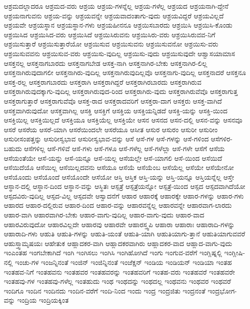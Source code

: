 {ಆಶ್ರಮದಲ್ಲಾದರೂ
ಆಶ್ರಮದ-ವರು
ಆಶ್ರಯ
ಆಶ್ರಯ-ಗಳನ್ನೆಲ್ಲ
ಆಶ್ರಯ-ಗಳೆಲ್ಲ
ಆಶ್ರಯದ
ಆಶ್ರಯನಾಗಿ-ದ್ದೇನೆ
ಆಶ್ರಯನಾಗುವನು
ಆಶ್ರಯ-ವನ್ನು
ಆಶ್ರಯವನ್ನೇ
ಆಶ್ರಯವಾದಂತಾಗು-ವುದು
ಆಶ್ರಯವಿದ್ದರೆ
ಆಶ್ರಯವಿಲ್ಲದೆ
ಆಶ್ರಯವೇ
ಆಶ್ರಯಸ್ಥಾನ
ಆಶ್ರಯಸ್ಥಾನ-ಗಳು
ಆಶ್ರಯಹೀನನೂ
ಆಶ್ರಯಿಸಬಾರದು
ಆಶ್ರಯಿಸಿ
ಆಶ್ರಯಿಸಿ-ಕೊಂಡು
ಆಶ್ರಯಿಸಿದ
ಆಶ್ರಯಿಸಿದ-ವರು
ಆಶ್ರಯಿಸಿದೆ
ಆಶ್ರಯಿಸಿರುವನು
ಆಶ್ರಯಿಸಿರು-ವರು
ಆಶ್ರಯಿಸಿರುವವ-ನಿಗೆ
ಆಶ್ರಯಿಸುತ್ತಾರೆ
ಆಶ್ರಯಿಸುತ್ತಾರೆಯೋ
ಆಶ್ರಯಿಸುವ
ಆಶ್ರಯಿಸುವನು
ಆಶ್ರಯಿಸುವನೋ
ಆಶ್ರಯಿಸು-ವರು
ಆಶ್ರಯಿಸುವವನು
ಆಶ್ರಯಿಸುವ-ವರು
ಆಶ್ರಯಿಸು-ವುದಿಲ್ಲ
ಆಶ್ರಯಿಸು-ವುದು
ಆಶ್ರಯಿಸುವುದೇ
ಆಶ್ವಾಸಯಾಮಾಸ
ಆಸಕ್ತನಲ್ಲ
ಆಸಕ್ತನಾಗಬಾರದು
ಆಸಕ್ತನಾಗಬೇಡ
ಆಸಕ್ತ-ನಾಗಿ
ಆಸಕ್ತನಾಗಿರ-ಬೇಕು
ಆಸಕ್ತನಾಗಿರ-ಲಿಲ್ಲ
ಆಸಕ್ತನಾಗಿರುವುದಾಗಲೀ
ಆಸಕ್ತನಾಗಿರು-ವುದಿಲ್ಲ
ಆಸಕ್ತನಾಗಿರುವುದಿಲ್ಲವೊ
ಆಸಕ್ತನಾಗು-ವುದಿಲ್ಲ
ಆಸಕ್ತನಾದರೆ
ಆಸಕ್ತನೂ
ಆಸಕ್ತ-ರಲ್ಲ
ಆಸಕ್ತರಾಗಬಾರದು
ಆಸಕ್ತರಾಗಿ
ಆಸಕ್ತರಾಗಿದ್ದರೆ
ಆಸಕ್ತರಾಗಿರಬಾರದು
ಆಸಕ್ತರಾಗಿರುವ
ಆಸಕ್ತರಾಗಿರುವುದಕ್ಕಾಗು-ವುದಿಲ್ಲ
ಆಸಕ್ತರಾಗಿರುವುದ-ರಿಂದ
ಆಸಕ್ತರಾಗಿರು-ವುದು
ಆಸಕ್ತರಾಗಿರುವೆವೊ
ಆಸಕ್ತರಾಗುತ್ತ
ಆಸಕ್ತರಾಗುತ್ತಾರೆ
ಆಸಕ್ತರಾಗುವೆವೊ
ಆಸಕ್ತ-ರಾದ
ಆಸಕ್ತರಾದವರಿಗೆ
ಆಸಕ್ತರಾ-ದಾಗ
ಆಸಕ್ತರು
ಆಸಕ್ತ-ವಾಗಿದೆ
ಆಸಕ್ತವಾಗಿರುವುದೋ
ಆಸಕ್ತವಾಗಿಲ್ಲ
ಆಸಕ್ತಿ
ಆಸಕ್ತಿಗೆ
ಆಸಕ್ತಿಯ
ಆಸಕ್ತಿಯನ್ನಿಡದೆ
ಆಸಕ್ತಿ-ಯನ್ನು
ಆಸಕ್ತಿ-ಯಿಂದ
ಆಸಕ್ತಿಯಿಲ್ಲ
ಆಸಕ್ತಿಯಿಲ್ಲದೆ
ಆಸಕ್ತಿಯೂ
ಆಸಕ್ತಿಯೆಲ್ಲ
ಆಸಕ್ತಿಯೇ
ಆಸನ
ಆಸನದ
ಆಸನ-ದಲ್ಲಿ
ಆಸನ-ವನ್ನು
ಆಸನವೂ
ಆಸರೆ
ಆಸರೆಯ
ಆಸರೆ-ಯಾಗಿ
ಆಸರೆಯಿಂದಲೇ
ಆಸರೆಯೂ
ಆಸೀತ
ಆಸುರ
ಆಸುರಂ
ಆಸುರೀ
ಆಸುರೀಂ
ಆಸುರೀಸಂಪತ್ತನ್ನು
ಆಸುರೀಸ್ವಭಾವ
ಆಸುರೀಸ್ವಭಾವ-ವನ್ನು
ಆಸೆ
ಆಸೆ-ಗಳ
ಆಸೆ-ಗಳನ್ನು
ಆಸೆ-ಗಳಿಂದ
ಆಸೆಗಳಿರ-ಬಹುದು
ಆಸೆಗಳಿಲ್ಲ
ಆಸೆ-ಗಳಿವೆ
ಆಸೆ-ಗಳು
ಆಸೆ-ಗಳೂ
ಆಸೆ-ಗಳೆಲ್ಲ
ಆಸೆ-ಗಳೆಲ್ಲಾ
ಆಸೆ-ಗಳೇ
ಆಸೆಗೆ
ಆಸೆಯ
ಆಸೆಯಂತೆಯೇ
ಆಸೆ-ಯನ್ನು
ಆಸೆ-ಯನ್ನೂ
ಆಸೆ-ಯಲ್ಲ
ಆಸೆಯಲ್ಲೇ
ಆಸೆ-ಯಾಗಲಿ
ಆಸೆ-ಯಿಂದ
ಆಸೆಯಿದೆ
ಆಸೆಯಿದೆಯೊ
ಆಸೆಯಿಲ್ಲ
ಆಸೆಯಿಲ್ಲದವನು
ಆಸೆಯೂ
ಆಸೆಯೆ
ಆಸೆಯೆಂಬ
ಆಸೆಯೆಲ್ಲ
ಆಸೆಯೇ
ಆಸೆಯೇನೋ
ಆಸೆಯೊಂದು
ಆಸೆಯೊಂದೆ
ಆಸೆಯೊಂದೇ
ಆಸೆಯೋ
ಆಸ್ತಿ
ಆಸ್ತಿಕ
ಆಸ್ತಿ-ಯನ್ನು
ಆಸ್ತಿ-ಯನ್ನೂ
ಆಸ್ತಿಯನ್ನೆಲ್ಲ
ಆಸ್ತೇ
ಆಸ್ಥಾನ-ದಲ್ಲಿ
ಆಸ್ಥಾನ-ದಿಂದ
ಆಸ್ಥಾನ-ವನ್ನು
ಆಸ್ಥಿತಃ
ಆಸ್ಪತ್ರೆ
ಆಸ್ಪತ್ರೆಯನ್ನೋ
ಆಸ್ಪತ್ರೆ-ಯಿಂದ
ಆಸ್ಪದ
ಆಸ್ಪದವಾಗಿದೆಯೋ
ಆಸ್ಪದವಿರು-ವುದಿಲ್ಲ
ಆಸ್ಪದ-ವಿಲ್ಲ
ಆಸ್ಪದವೇ
ಆಸ್ವಾದನೆಗೆ
ಆಹಾರ
ಆಹಾರಕ್ಕೆ
ಆಹಾರಕ್ಕೇ
ಆಹಾರ-ಗಳನ್ನು
ಆಹಾರ-ಗಳು
ಆಹಾರದ
ಆಹಾರ-ದಲ್ಲಿರುವ
ಆಹಾರ-ದಿಂದ
ಆಹಾರ-ವನ್ನು
ಆಹಾರವನ್ನೆಲ್ಲ
ಆಹಾರವನ್ನೇ
ಆಹಾರವಾಗ-ಲಾರದು
ಆಹಾರ-ವಾಗಿ
ಆಹಾರವಾಗಿರ-ಬೇಕು
ಆಹಾರ-ವಾಗು-ವುದಿಲ್ಲ
ಆಹಾರ-ವಾಗು-ವುದು
ಆಹಾರ-ವಾದ
ಆಹಾರವಿರುವುದೋ
ಆಹಾರವಿಲ್ಲದೇ
ಆಹಾರವು
ಆಹಾರವೇ
ಆಹಾರಸ್ತ್ವಪಿ
ಆಹಾರಾ
ಆಹಾರಾಃ
ಆಹಾರಾದಿ-ಗಳನ್ನು
ಆಹಾರಾದಿ-ಗಳು
ಆಹುತಿ
ಆಹುತಿ-ಗಳನ್ನು
ಆಹುತಿ-ಯಂತೆ
ಆಹುತಿ-ಯಾಗಿ
ಆಹುತಿಯಾಗು-ತ್ತಾನೆ
ಆಹುತಿಯಾಗುವವರೆ
ಆಹುಸ್ತ್ವಾಮೃಷಯಃ
ಆಹೇತುಕ
ಆಹ್ಲಾದಕರ-ವಾಗಿ
ಆಹ್ಲಾದಕರವಾಗಿರು
ಆಹ್ಲಾದಕರ-ವಾದ
ಆಹ್ಲಾದ-ವಾಗು-ವುದು
ಇಂಎಂತಹ
ಇಂಗಬೇಕಾಗಿದೆ
ಇಂಗಿ
ಇಂಗಿಸಲು
ಇಂಗಿಸಿ
ಇಂಗಿಹೋಗಿದೆ
ಇಂಗು
ಇಂಗುವ-ವರೆಗೆ
ಇಂಗ್ಲಿಷ್ನಲ್ಲಿ
ಇಂಗ್ಲೀಷಿ-ನಲ್ಲಿ
ಇಂಚು-ಗಳ
ಇಂಜನ್ನಿನಂತೆ
ಇಂಜಿನ್
ಇಂಜಿನ್ನಿನಂತೆ
ಇಂಜೆಕ್ಷನ್
ಇಂಡಿಯ
ಇಂಡಿಯನ್
ಇಂಡಿಯಾ
ಇಂತಹ
ಇಂತಹವ-ನಿಗೆ
ಇಂತಹವನು
ಇಂತಹವರ
ಇಂತಹವರನ್ನು
ಇಂತಹವರಿಗೆ
ಇಂತಹ-ವರು
ಇಂತಹವರೆ
ಇಂತಹವರೇ
ಇಂತಹವು-ಗಳ
ಇಂತಹವು-ಗಳೆಲ್ಲ
ಇಂತಹುದು
ಇಂಥ
ಇಂಥದನ್ನು
ಇಂಥದಲ್ಲ
ಇಂಥವನು
ಇಂಥವರ
ಇಂಥವರೆ
ಇಂದಿಗೂ
ಇಂದಿನ
ಇಂದಿನದು
ಇಂದಿನ-ವರೆಗೆ
ಇಂದಿ-ನಿಂದ
ಇಂದು
ಇಂದ್ರ
ಇಂದ್ರಜಿತು
ಇಂದ್ರನಂತೆ
ಇಂದ್ರಭೋಗ-ವನ್ನು
ಇಂದ್ರಿಯ
ಇಂದ್ರಿಯಕ್ಕಿಂತ
}
